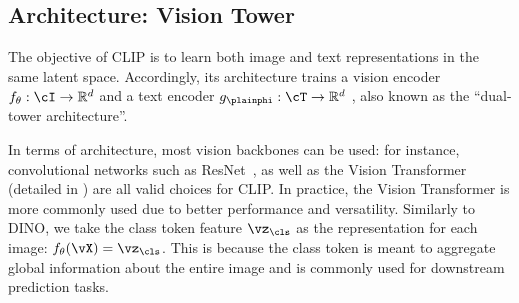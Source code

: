 \documentclass[../../book-main.tex]{subfiles}
\begin{document}
\subsection{Architecture: Vision Tower}\label{sub:clip_vision_tower}
The objective of CLIP is to learn both image and text representations
in the same latent space. Accordingly, its architecture trains a
vision encoder \(f_{\theta}: \cI \to \mathbb{R}^{d} \) and a text
encoder \(g_{\plainphi}: \cT \to \mathbb{R}^{d} \) , also known as
the ``dual-tower architecture''.

In terms of architecture, most vision backbones can be used: for
instance, convolutional networks such as ResNet~\citep{He2016-lc}, as
well as the Vision Transformer~\citep{dosovitskiy2020image} (detailed
in ) are all valid
choices for CLIP. In practice, the Vision Transformer is more
commonly used due to better performance and versatility. Similarly to
DINO, we take the class token feature \(\vz_{\cls}\) as the
representation for each image: \(f_{\theta}(\vX) = \vz_{\cls}\). This
is because the class token is meant to aggregate global information
about the entire image and is commonly used for downstream prediction tasks.

\end{document}
